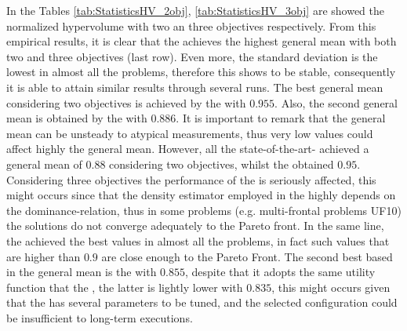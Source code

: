 In the Tables \ref{tab:StatisticsHV_2obj}, \ref{tab:StatisticsHV_3obj} are showed the normalized hypervolume with two an three objectives respectively.
%
From this empirical results, it is clear that the \VSDMOEA{} achieves the highest general mean \HV{} with both two and three objectives (last row).
%
Even more, the standard deviation is the lowest in almost all the problems, therefore this \MOEA{} shows to be stable, consequently it is able to attain similar results through several runs.
%
The best general mean considering two objectives is achieved by the \VSDMOEA{} with $0.955$.
%
Also, the second general mean is obtained by the \NSGAII{} with $0.886$.
%
It is important to remark that the general mean can be unsteady to atypical measurements, thus very low values could affect highly the general mean.
%
However, all the state-of-the-art-\MOEAS{} achieved a general mean of $0.88$ considering two objectives, whilst the \VSDMOEA{} obtained $0.95$.
%
Considering three objectives the performance of the \NSGAII{} is seriously affected, this might occurs since that the density estimator employed in the \NSGAII{} highly depends on the dominance-relation, thus in some problems (e.g. multi-frontal problems UF10) the solutions do not converge adequately to the Pareto front.
%
In the same line, the \VSDMOEA{} achieved the best \HV{} values in almost all the problems, in fact such values that are higher than $0.9$ are close enough to the Pareto Front.
%
The second best \MOEA{} based in the general mean is the \RMOEA{} with $0.855$, despite that it adopts the same utility function that the \MOEAD{}, the latter is lightly lower with $0.835$, this might occurs given that the \MOEAD{} has several parameters to be tuned, and the selected configuration could be insufficient to long-term executions.
%


